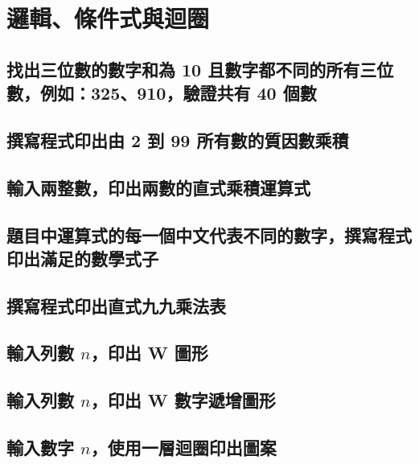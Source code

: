 \chapter{邏輯、條件式與迴圈}

\section{找出三位數的數字和為 10 且數字都不同的所有三位數，例如：325、910，驗證共有 40 個數}


\section{撰寫程式印出由 2 到 99 所有數的質因數乘積}


\section{輸入兩整數，印出兩數的直式乘積運算式}


\section{題目中運算式的每一個中文代表不同的數字，撰寫程式印出滿足的數學式子}


\section{撰寫程式印出直式九九乘法表}


\section{輸入列數 $n$，印出 W 圖形}


\section{輸入列數 $n$，印出 W 數字遞增圖形}


\section{輸入數字 $n$，使用一層迴圈印出圖案}


